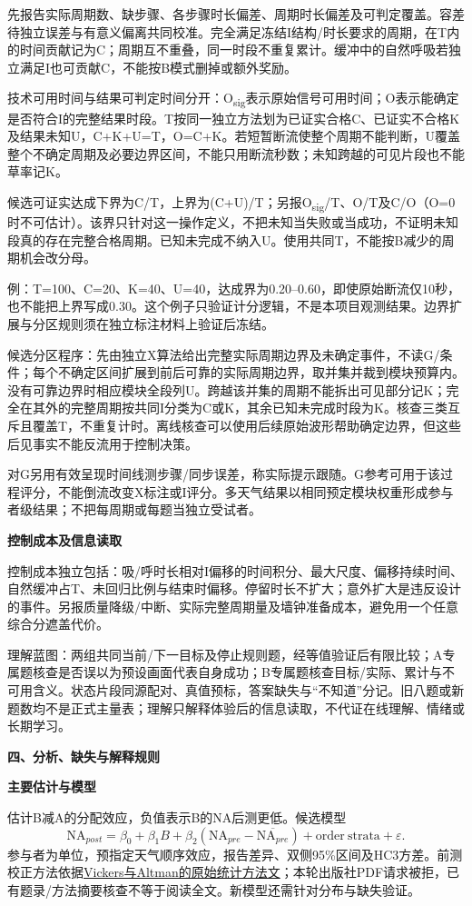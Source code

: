 \documentclass[11pt,a4paper]{article}
\newcommand{\reviewsection}[1]{\par\Needspace{6\baselineskip}\begin{center}{\titlelatin\titlecjk\bfseries\fontsize{14}{20}\selectfont #1}\end{center}}
\newcommand{\reviewsubsection}[1]{\par\Needspace{4\baselineskip}\begin{center}{\titlelatin\titlecjk\bfseries\fontsize{12}{18}\selectfont #1}\end{center}}
\begin{document}
先报告实际周期数、缺步骤、各步骤时长偏差、周期时长偏差及可判定覆盖。容差待独立误差与有意义偏离共同校准。完全满足冻结I结构/时长要求的周期，在T内的时间贡献记为C；周期互不重叠，同一时段不重复累计。缓冲中的自然呼吸若独立满足I也可贡献C，不能按B模式删掉或额外奖励。

技术可用时间与结果可判定时间分开：O\textsubscript{sig}表示原始信号可用时间；O表示能确定是否符合I的完整结果时段。T按同一独立方法划为已证实合格C、已证实不合格K及结果未知U，C+K+U=T，O=C+K。若短暂断流使整个周期不能判断，U覆盖整个不确定周期及必要边界区间，不能只用断流秒数；未知跨越的可见片段也不能草率记K。

候选可证实达成下界为C/T，上界为(C+U)/T；另报O\textsubscript{sig}/T、O/T及C/O（O=0时不可估计）。该界只针对这一操作定义，不把未知当失败或当成功，不证明未知段真的存在完整合格周期。已知未完成不纳入U。使用共同T，不能按B减少的周期机会改分母。

例：T=100、C=20、K=40、U=40，达成界为0.20--0.60，即使原始断流仅10秒，也不能把上界写成0.30。这个例子只验证计分逻辑，不是本项目观测结果。边界扩展与分区规则须在独立标注材料上验证后冻结。

候选分区程序：先由独立X算法给出完整实际周期边界及未确定事件，不读G/条件；每个不确定区间扩展到前后可靠的实际周期边界，取并集并裁到模块预算内。没有可靠边界时相应模块全段列U。跨越该并集的周期不能拆出可见部分记K；完全在其外的完整周期按共同I分类为C或K，其余已知未完成时段为K。核查三类互斥且覆盖T，不重复计时。离线核查可以使用后续原始波形帮助确定边界，但这些后见事实不能反流用于控制决策。

对G另用有效呈现时间线测步骤/同步误差，称实际提示跟随。G参考可用于该过程评分，不能倒流改变X标注或I评分。多天气结果以相同预定模块权重形成参与者级结果；不把每周期或每题当独立受试者。

\reviewsubsection{3.4 控制成本及信息读取}
控制成本独立包括：吸/呼时长相对I偏移的时间积分、最大尺度、偏移持续时间、自然缓冲占T、未回归比例与结束时偏移。停留时长不扩大；意外扩大是违反设计的事件。另报质量降级/中断、实际完整周期量及墙钟准备成本，避免用一个任意综合分遮盖代价。

理解蓝图：两组共同当前/下一目标及停止规则题，经等值验证后有限比较；A专属题核查是否误以为预设画面代表自身成功；B专属题核查目标/实际、累计与不可用含义。状态片段同源配对、真值预标，答案缺失与“不知道”分记。旧八题或新题数均不是正式主量表；理解只解释体验后的信息读取，不代证在线理解、情绪或长期学习。

\reviewsection{四、分析、缺失与解释规则}
\reviewsubsection{4.1 主要估计与模型}
估计B减A的分配效应，负值表示B的NA后测更低。候选模型
\[\mathrm{NA}_{post}=\beta_0+\beta_1 B+\beta_2(\mathrm{NA}_{pre}-\overline{\mathrm{NA}_{pre}})+\mathrm{order\ strata}+\varepsilon.\]
参与者为单位，预指定天气顺序效应，报告差异、双侧95\%区间及HC3方差。前测校正方法依据\href{https://www.bmj.com/content/323/7321/1123}{Vickers与Altman的原始统计方法文}；本轮出版社PDF请求被拒，已有题录/方法摘要核查不等于阅读全文。新模型还需针对分布与缺失验证。
\end{document}
